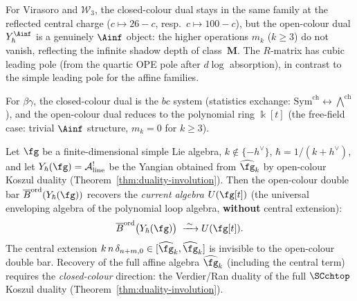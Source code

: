 \begin{construction}
For Virasoro and $\mathcal{W}_3$, the closed-colour dual
stays in the same family at the reflected central charge
($c \mapsto 26 - c$, resp.\ $c \mapsto 100 - c$), but
the open-colour dual $Y^{\Ainf}_\hbar$ is a genuinely
$\Ainf$ object: the higher operations $m_k$ ($k \ge 3$)
do not vanish, reflecting the infinite shadow depth of
class~$\mathbf{M}$. The $R$-matrix has cubic leading
pole (from the quartic OPE pole after $d\log$ absorption),
in contrast to the simple leading pole for the affine
families.

For $\beta\gamma$, the closed-colour dual is the $bc$
system (statistics exchange: $\mathrm{Sym}^{\mathrm{ch}}
\leftrightarrow \bigwedge^{\mathrm{ch}}$), and the
open-colour dual reduces to the polynomial ring $\Bbbk[t]$
(the free-field case: trivial $\Ainf$ structure, $m_k = 0$
for $k \ge 3$).

\begin{proposition}
\label{prop:open-colour-double-bar}%
%
Let $\fg$ be a finite-dimensional simple Lie algebra,
$k\notin\{-h^\vee\}$, $\hbar=1/(k{+}h^\vee)$, and let
$Y_\hbar(\fg)=\cA^!_{\mathrm{line}}$ be the Yangian obtained
from $\widehat{\fg}_k$ by open-colour Koszul duality
\textup{(Theorem~\ref{thm:duality-involution})}.
Then the open-colour double bar
$\Barchord(Y_\hbar(\fg))$ recovers the
\emph{current algebra} $U(\fg[t])$
\textup{(}the universal enveloping algebra of the polynomial
loop algebra, \textbf{without} central extension\textup{)}:
\[
 \Barchord\bigl(Y_\hbar(\fg)\bigr)
 \;\xrightarrow{\;\sim\;}
 U(\fg[t]).
\]
The central extension
$k\,n\,\delta_{n+m,0}\in[\widehat{\fg}_k,\widehat{\fg}_k]$
is invisible to the open-colour double bar.
Recovery of the full affine algebra $\widehat{\fg}_k$
\textup{(}including the central term\textup{)} requires the
\emph{closed-colour} direction: the Verdier\slash Ran duality of
the full $\SCchtop$ Koszul duality
\textup{(Theorem~\ref{thm:duality-involution})}.
\end{proposition}


\end{construction}
